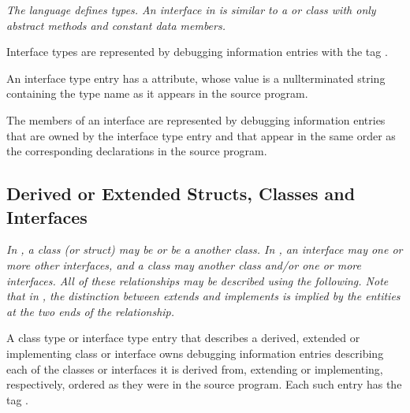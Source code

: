 \textit{The  language defines  types. 
An interface
in  is similar to a  or 
 class with only abstract
methods and constant data members.}

Interface types 
are represented by debugging information
entries with the 
tag .

An interface type entry has 
a  attribute,
whose
value is a null\dash terminated string containing the type name
as it appears in the source program.

The members of an interface are represented by debugging
information entries that are owned by the interface type
entry and that appear in the same order as the corresponding
declarations in the source program.

\subsection{Derived or Extended Structs, Classes and Interfaces}
\label{chap:derivedorextendedstructsclasesandinterfaces}

\textit{In , a class (or struct) 
may 
be  or be a
 another class. 
In , an interface may 
one 
or more other interfaces, and a class may  another
class and/or  one or more interfaces. All of these
relationships may be described using the following. Note that
in , 
the distinction between extends and implements is
implied by the entities at the two ends of the relationship.}

A class type or interface type entry that describes a
derived, extended or implementing class or interface owns
debugging information entries describing each of the classes
or interfaces it is derived from, extending or implementing,
respectively, ordered as they were in the source program. Each
such entry has 
the 
tag .

